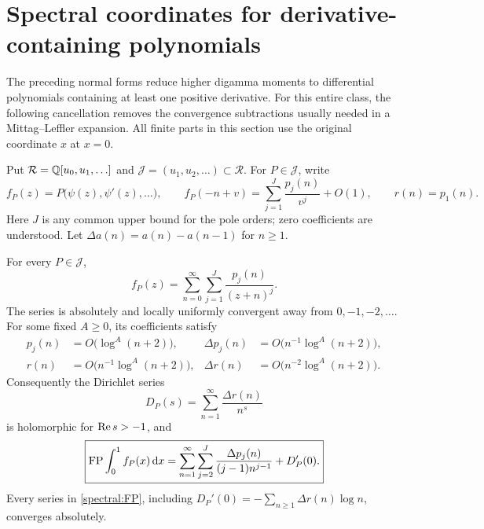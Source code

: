 \section{Spectral coordinates for derivative-containing polynomials}
\label{spectral:sec}

The preceding normal forms reduce higher digamma moments to differential
polynomials containing at least one positive derivative.  For this
entire class, the following cancellation removes the convergence
subtractions usually needed in a Mittag--Leffler expansion.  All finite
parts in this section use the original coordinate $x$ at $x=0$.

Put $\mathcal R=\mathbb Q[u_0,u_1,\ldots]$ and
$\mathcal J=(u_1,u_2,\ldots)\subset\mathcal R$.  For $P\in\mathcal J$,
write
\[
 f_P(z)=P\bigl(\psi(z),\psi'(z),\ldots\bigr),\qquad
 f_P(-n+v)=\sum_{j=1}^{J}\frac{p_j(n)}{v^j}+O(1),
 \qquad r(n)=p_1(n).
\]
Here $J$ is any common upper bound for the pole orders; zero coefficients
are understood.  Let $\Delta a(n)=a(n)-a(n-1)$ for $n\geq1$.

\begin{theorem}
\label{spectral:ML}
For every $P\in\mathcal J$,
\begin{equation}\label{spectral:MLseries}
 \boxed{\displaystyle
 f_P(z)=\sum_{n=0}^{\infty}\sum_{j=1}^{J}
                    \frac{p_j(n)}{(z+n)^j}.}
\end{equation}
The series is absolutely and locally uniformly convergent away from
$0,-1,-2,\ldots$.  For some fixed $A\geq0$, its coefficients satisfy
\begin{align}
 p_j(n)&=O\bigl(\log^A(n+2)\bigr),&
 \Delta p_j(n)&=O\bigl(n^{-1}\log^A(n+2)\bigr),\label{spectral:pest}\\
 r(n)&=O\bigl(n^{-1}\log^A(n+2)\bigr),&
 \Delta r(n)&=O\bigl(n^{-2}\log^A(n+2)\bigr).
 \label{spectral:rest}
\end{align}
Consequently the Dirichlet series
\begin{equation}\label{spectral:DP}
 D_P(s)=\sum_{n=1}^{\infty}\frac{\Delta r(n)}{n^s}
\end{equation}
is holomorphic for $\operatorname{Re} s>-1$, and
\begin{equation}\label{spectral:FP}
 \boxed{\displaystyle
 \operatorname{FP}\int_0^1 f_P(x)\,\mathrm d x
 =\sum_{n=1}^{\infty}\sum_{j=2}^{J}
       \frac{\Delta p_j(n)}{(j-1)n^{j-1}}+D_P'(0).}
\end{equation}
Every series in \eqref{spectral:FP}, including
$D_P'(0)=-\sum_{n\geq1}\Delta r(n)\log n$, converges absolutely.
\end{theorem}


